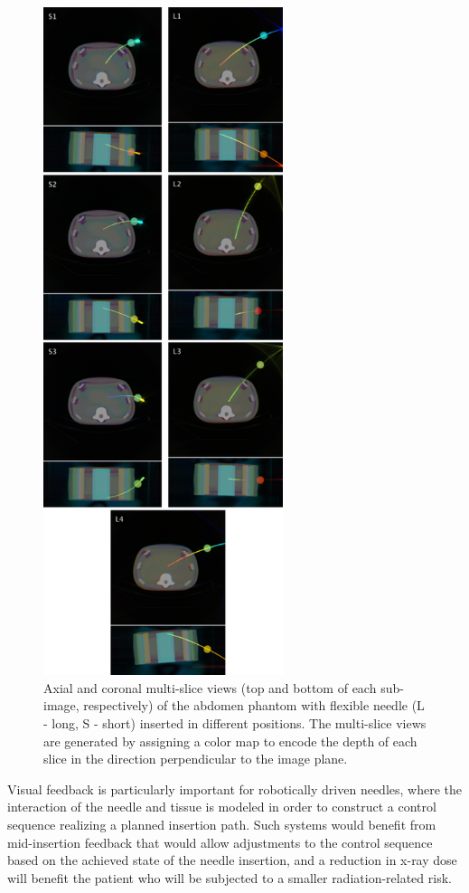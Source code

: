 \documentclass[letterpaper, 11 pt, conference]{ieeeconf}  %
\begin{document}
\begin{figure}[]
\centering
\includegraphics[width=7cm]{multislices.png}
\caption{Axial and coronal multi-slice views (top and bottom of each sub-image, respectively) of the abdomen phantom with flexible needle (L - long, S - short) inserted in different positions. The multi-slice views are generated by assigning a color map to encode the depth of each slice in the direction perpendicular to the image plane.}
\label{multislices_fig}
\end{figure}

Visual feedback is particularly important for robotically driven needles, where the interaction of the needle and tissue is modeled in order to construct a control sequence realizing a planned insertion path. Such systems would benefit from mid-insertion feedback that would allow adjustments to the control sequence based on the achieved state of the needle insertion, and a reduction in x-ray dose will benefit the patient who will be subjected to a smaller radiation-related risk.
\end{document}
